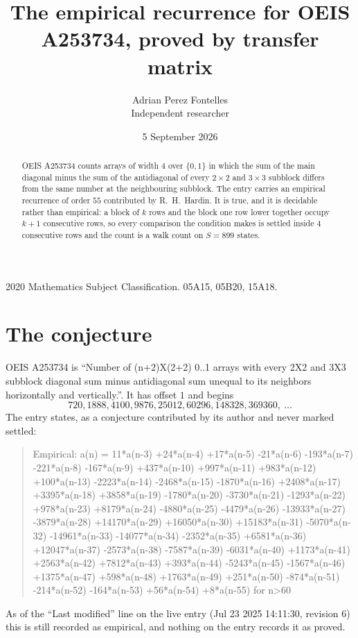 \documentclass[11pt,a4paper]{article}
\title{The empirical recurrence for OEIS A253734, proved by transfer matrix}
\author{Adrian Perez Fontelles\\ \small Independent researcher}
\date{5 September 2026}
\theoremstyle{plain}
\theoremstyle{definition}
\begin{document}
\maketitle

\begin{abstract}
OEIS A253734 counts arrays of width $4$ over $\{0,1\}$ in which the sum of the main diagonal minus the sum of the antidiagonal of every $2\times2$ and $3\times3$ subblock differs from the same number at the neighbouring subblock. The entry carries an
empirical recurrence of order $55$ contributed by R.~H.~Hardin. It is true, and it is
decidable rather than empirical: a block of $k$ rows and the block one row lower together
occupy $k+1$ consecutive rows, so every comparison the condition makes is settled inside
$4$ consecutive rows and the count is a walk count on $S=899$ states.
\end{abstract}

\noindent\small 2020 Mathematics Subject Classification. 05A15, 05B20, 15A18.\normalsize

\section{The conjecture}

OEIS A253734 is ``Number of (n+2)X(2+2) 0..1 arrays with every 2X2 and 3X3 subblock diagonal sum minus antidiagonal sum unequal to its neighbors horizontally and vertically.''. It has offset $1$ and begins
\[
720, 1888, 4100, 9876, 25012, 60296, 148328, 369360,\ \dots
\]
The entry states, as a conjecture contributed by its author and never marked settled:
\begin{quote}
Empirical: a(n) = 11*a(n-3) +24*a(n-4) +17*a(n-5) -21*a(n-6) -193*a(n-7) -221*a(n-8) -167*a(n-9) +437*a(n-10) +997*a(n-11) +983*a(n-12) +100*a(n-13) -2223*a(n-14) -2468*a(n-15) -1870*a(n-16) +2408*a(n-17) +3395*a(n-18) +3858*a(n-19) -1780*a(n-20) -3730*a(n-21) -1293*a(n-22) +978*a(n-23) +8179*a(n-24) -4880*a(n-25) -4479*a(n-26) -13933*a(n-27) -3879*a(n-28) +14170*a(n-29) +16050*a(n-30) +15183*a(n-31) -5070*a(n-32) -14961*a(n-33) -14077*a(n-34) -2352*a(n-35) +6581*a(n-36) +12047*a(n-37) -2573*a(n-38) -7587*a(n-39) -6031*a(n-40) +1173*a(n-41) +2563*a(n-42) +7812*a(n-43) +393*a(n-44) -5243*a(n-45) -1567*a(n-46) +1375*a(n-47) +598*a(n-48) +1763*a(n-49) +251*a(n-50) -874*a(n-51) -214*a(n-52) -164*a(n-53) +56*a(n-54) +8*a(n-55) for n>60
\end{quote}
As of the ``Last modified'' line on the live entry (Jul 23 2025 14:11:30, revision 6) this is still
recorded as empirical, and nothing on the entry records it as proved.
\end{document}

